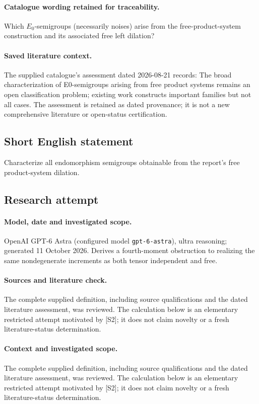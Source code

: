 \documentclass[11pt]{article}
\begin{document}
\paragraph{Catalogue wording retained for traceability.}
Which $E_0$-semigroups (necessarily noises) arise from the free-product-system construction and its associated free left dilation?

\paragraph{Saved literature context.} The supplied catalogue's assessment dated 2026-08-21 records: The broad characterization of E0-semigroups arising from free product systems remains an open classification problem; existing work constructs important families but not all cases. The assessment is retained as dated provenance; it is not a new comprehensive literature or open-status certification.
\subsection{Short English statement}
Characterize all endomorphism semigroups obtainable from the report's free product-system dilation.
\subsection{Research attempt}
\paragraph{Model, date and investigated scope.}
OpenAI GPT-6 Astra (configured model \texttt{gpt-6-astra}), ultra reasoning; generated 11 October 2026. Derives a fourth-moment obstruction to realizing the same nondegenerate increments as both tensor independent and free.

\paragraph{Sources and literature check.}
The complete supplied definition, including source qualifications and the dated literature assessment, was reviewed. The calculation below is an elementary restricted attempt motivated by [S2]; it does not claim novelty or a fresh literature-status determination.

\paragraph{Context and investigated scope.} The complete supplied definition, including source qualifications and the dated literature assessment, was reviewed. The calculation below is an elementary restricted attempt motivated by [S2]; it does not claim novelty or a fresh literature-status determination.
\end{document}
